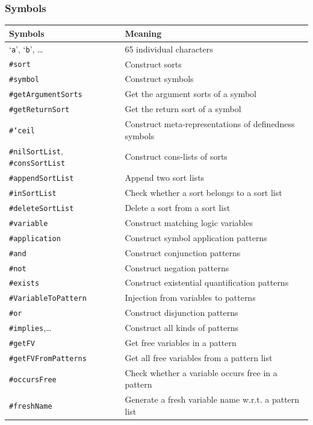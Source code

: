 \documentclass[UTF8,11pt]{article}
\theoremstyle{plain}
\theoremstyle{definition}
\theoremstyle{remark}
\newcommand{\sharpsymbol}{\#}
\newcommand{\Ksort}{\texttt{\sharpsymbol sort}}
\newcommand{\Ksymbol}{\texttt{\sharpsymbol symbol}}
\newcommand{\KSymbolceil}{\texttt{\sharpsymbol `ceil}}
\newcommand{\KgetArgumentSorts}{\texttt{\sharpsymbol getArgumentSorts}}
\newcommand{\KgetReturnSort}{\texttt{\sharpsymbol getReturnSort}}
\newcommand{\KnilKSortList}{\texttt{\sharpsymbol nilSortList}}
\newcommand{\KconsKSortList}{\texttt{\sharpsymbol consSortList}}
\newcommand{\KappendKSortList}{\texttt{\sharpsymbol appendSortList}}
\newcommand{\KinKSortList}{\texttt{\sharpsymbol inSortList}}
\newcommand{\KdeleteKSortList}{\texttt{\sharpsymbol deleteSortList}}
\newcommand{\KVariableToKPattern}{\texttt{\sharpsymbol VariableToPattern}}
\newcommand{\Kvariable}{\texttt{\sharpsymbol variable}}
\newcommand{\Kand}{\texttt{\sharpsymbol  \slashsymbol and}}
\newcommand{\Kor}{\texttt{\sharpsymbol \slashsymbol  or}}
\newcommand{\Kimplies}{\texttt{\sharpsymbol  \slashsymbol implies}}
\newcommand{\Knot}{\texttt{\sharpsymbol  \slashsymbol not}}
\newcommand{\Kapplication}{\texttt{\sharpsymbol application}}
\newcommand{\Kexists}{\texttt{\sharpsymbol \slashsymbol  exists}}
\newcommand{\KgetFV}{\texttt{\sharpsymbol getFV}}
\newcommand{\KgetFVFromPatterns}{\texttt{\sharpsymbol getFVFromPatterns}}
\newcommand{\KoccursFree}{\texttt{\sharpsymbol occursFree}}
\newcommand{\KfreshName}{\texttt{\sharpsymbol freshName}}
\newcommand{\quottt}[1]{\textrm{\lq\texttt{#1}\rq}}
\newcommand{\slashsymbol}{\symbol{92}}
\begin{document}
\subsubsection{Symbols}
	\begin{longtable}{l|l}
	    \textbf{Symbols} & \textbf{Meaning} \\
	    \hline
	    \endhead
	    \quottt{a}, \quottt{b}, \dots & 65 individual characters \\
	    \Ksort & Construct sorts \\
	    \Ksymbol & Construct symbols \\
	    \KgetArgumentSorts & Get the argument sorts of a symbol \\
	    \KgetReturnSort & Get the return sort of a symbol \\
	    \KSymbolceil & Construct meta-representations of definedness symbols 
	    \\
	    \KnilKSortList, \KconsKSortList & Construct cons-lists of sorts \\
	    \KappendKSortList & Append two sort lists \\
	    \KinKSortList & Check whether a sort belongs to a sort list \\
	    \KdeleteKSortList & Delete a sort from a sort list \\
	    \Kvariable & Construct matching logic variables \\
	    \Kapplication & Construct symbol application patterns \\
	    \Kand & Construct conjunction patterns \\
	    \Knot & Construct negation patterns \\
	    \Kexists & Construct existential quantification patterns \\
	    \KVariableToKPattern & Injection from variables to patterns \\
	    \Kor & Construct disjunction patterns \\
	    \Kimplies,\dots & Construct all kinds of patterns \\
	    \KgetFV & Get free variables in a pattern \\
	    \KgetFVFromPatterns & Get all free variables from a pattern list \\
	    \KoccursFree & Check whether a variable occurs free in a pattern \\
	    \KfreshName & Generate a fresh variable name w.r.t. a pattern list \\

\end{longtable}
\end{document}
